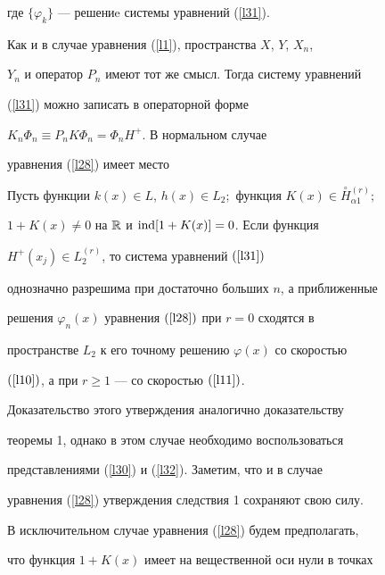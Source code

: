 где $\{\varphi_k\}$ --- решениe системы уравнений (\ref{l31}).





Как и в случае уравнения (\ref{l1}), пространства $X$, $Y$, $X_n$,


$Y_n$ и оператор $P_n$ имеют тот же смысл. Тогда систему уравнений


(\ref{l31}) можно записать в операторной форме


$K_n\Phi_n\equiv P_nK\Phi_n=\Phi_nH^+$. В нормальном случае


уравнения (\ref{l28}) имеет место








\begin{thm}


Пусть функции $k(x)\in L$, $h(x) \in


L_2;$ функция $K(x) \in \overset{\circ}{H}{}^{(r)}_{\alpha1};$


$1+K(x)\neq 0$ на $\Bbb R$ и $\operatorname{ind}  [1+K(x)]=0$. Если функция


$H^+(x_j)\in L_2^{(r)}$, то система уравнений $(\ref{l31})$


однозначно разрешима при достаточно больших $n$, а приближенные


решения $\varphi_n(x)$ уравнения $(\ref{l28})$ при $r=0$ сходятся в


пространстве $L_2$ к его точному решению $\varphi(x)$ со скоростью


$(\ref{l10})$, а при $r\geqslant 1$ --- со скоростью $(\ref{l11})$.


\end{thm}








Доказательство этого утверждения аналогично доказательству


теоремы 1, однако в этом случае необходимо воспользоваться


представлениями (\ref{l30}) и (\ref{l32}). Заметим, что и в случае


уравнения (\ref{l28}) утверждения следствия 1 сохраняют свою силу.





В исключительном случае уравнения (\ref{l28}) будем предполагать,


что функция $1+K(x)$ имеет на вещественной оси нули в точках


